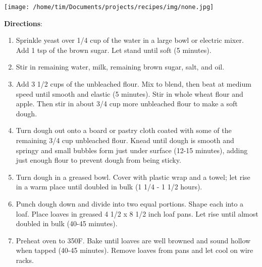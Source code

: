 \documentclass[11pt, twoside, openany]{book}
\begin{document}
\begin{minipage}[t]{\linewidth}
\begin{minipage}[t]{0.18\linewidth}
\texttt{[image: /home/tim/Documents/projects/recipes/img/none.jpg]}\\
\end{minipage}\vspace{3mm}
\textbf{Directions}:
\vspace{-3mm}\begin{enumerate}\setlength\itemsep{-1mm}
\item Sprinkle yeast over 1/4 cup of the water in a large bowl or electric mixer. Add 1 tsp of the brown sugar. Let stand until soft (5 minutes).
\item Stir in remaining water, milk, remaining brown sugar, salt, and oil.
\item Add 3 1/2 cups of the unbleached flour. Mix to blend, then beat at medium speed until smooth and elastic (5 minutes). Stir in whole wheat flour and apple. Then stir in about 3/4 cup more unbleached flour to make a soft dough.
\item Turn dough out onto a board or pastry cloth coated with some of the remaining 3/4 cup unbleached flour. Knead until dough is smooth and springy and small bubbles form just under surface (12-15 minutes), adding just enough flour to prevent dough from being sticky.
\item Turn dough in a greased bowl. Cover with plastic wrap and a towel; let rise in a warm place until doubled in bulk (1 1/4 - 1 1/2 hours).
\item Punch dough down and divide into two equal portions. Shape each into a loaf. Place loaves in greased 4 1/2 x 8 1/2 inch loaf pans. Let rise until almost doubled in bulk (40-45 minutes).
\item Preheat oven to 350F. Bake until loaves are well browned and sound hollow when tapped (40-45 minutes). Remove loaves from pans and let cool on wire racks.
\end{enumerate}
\end{minipage}\vspace{8mm}
\end{document}
